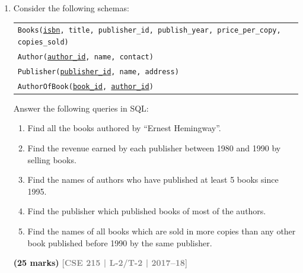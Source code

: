 \documentclass[12pt,a3paper]{article}
\newcommand{\yr}[1]{\hfill\textcolor{gray}{\small\textbf{[#1]}}}
\newcommand{\mk}[1]{\textcolor{orange!70!black}{\small\textbf{(#1 marks)}}}
\begin{document}
\begin{enumerate}
\begin{center}
\end{center}
\mk{10} \yr{CSE 215 | L-2/T-2 | 2018--19}


\item Consider the following schemas:
\begin{center}
\begin{tabular}{l}
\texttt{Books(\underline{isbn}, title, publisher\_id, publish\_year, price\_per\_copy, copies\_sold)}\\
\texttt{Author(\underline{author\_id}, name, contact)}\\
\texttt{Publisher(\underline{publisher\_id}, name, address)}\\
\texttt{AuthorOfBook(\underline{book\_id}, \underline{author\_id})}
\end{tabular}
\end{center}
Answer the following queries in SQL:
\begin{enumerate}
  \item Find all the books authored by ``Ernest Hemingway''.
  \item Find the revenue earned by each publisher between 1980 and 1990 by selling books.
  \item Find the names of authors who have published at least 5 books since 1995.
  \item Find the publisher which published books of most of the authors.
  \item Find the names of all books which are sold in more copies than any other book published before 1990 by the same publisher.
\end{enumerate}
\mk{25} \yr{CSE 215 | L-2/T-2 | 2017--18}


\end{enumerate}
\end{document}
